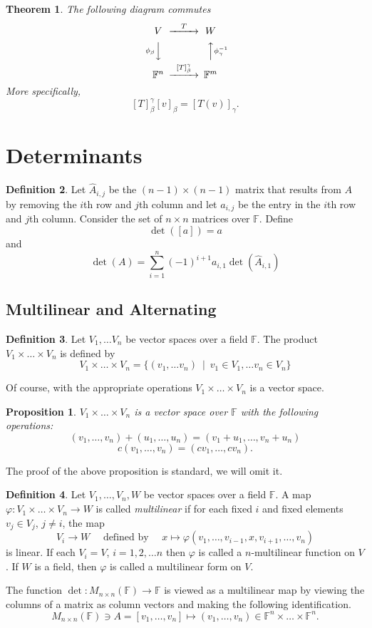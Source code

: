 \documentclass[12pt,letterpaper]{article}
\theoremstyle{plain}
\newtheorem{theorem}{Theorem}[section]
\newtheorem{proposition}{Proposition}[section]
\theoremstyle{definition}
\newtheorem{definition}[theorem]{Definition}
\numberwithin{equation}{section}
\begin{document}
\begin{theorem} The following diagram commutes\\
\[
\begin{CD}
V @>T>> W\\
@V\phi_{\beta}VV @AA\phi_\gamma^{-1} A\\
\mathbb{F}^n @>[T]_{\beta}^\gamma>> \mathbb{F}^m
\end{CD}
\]
More specifically, 
\[[T]_{\beta}^\gamma[v]_{\beta}=[T(v)]_{\gamma}.\]
\end{theorem}
\section{Determinants}
\begin{definition} Let $\hat{A}_{i,j}$ be the $(n-1)\times (n-1)$ matrix that results from $A$ by removing the $i$th row and $j$th column and let $a_{i,j}$ be the entry in the $i$th row and $j$th column.  Consider the set of $n\times n$ matrices over $\mathbb{F}$.  
Define \[\det([a])=a\]
and
\[\det(A)=\sum_{i=1}^n(-1)^{i+1}a_{i,1}\det(\hat{A}_{i,1})\]
\end{definition}
\subsection{Multilinear and Alternating}\label{Multilinear and Alternating}

\begin{definition} Let $V_1, \ldots V_n$ be vector spaces over a field $\mathbb{F}$. The product $V_1\times \ldots \times V_n$ is defined by 
\[V_1\times \ldots \times V_n=\{(v_1,\ldots v_n)\ \mid \ v_1\in V_1, \ldots v_n\in V_n\}\] 
\end{definition}
Of course, with the appropriate operations $V_1\times \ldots \times V_n$ is a vector space. 
\begin{proposition} $V_1\times \ldots \times V_n$ is a vector space over $\mathbb{F}$ with the following operations:
\[(v_1,\ldots, v_n)+(u_1, \ldots, u_n)=(v_1+u_1, \ldots, v_n+u_n)\]
\[c(v_1, \ldots, v_n)=(cv_1, \ldots, cv_n).\]
\end{proposition}
The proof of the above proposition is standard, we will omit it. 
\begin{definition} Let $V_1, \ldots ,V_n, W$ be vector spaces over a field $\mathbb{F}$. 
A map $\varphi:V_1\times\ldots \times V_n\rightarrow W$ is called \emph{multilinear} if for each fixed $i$ and fixed elements $v_j\in V_j$, $j\neq i$, the map
\[V_i\rightarrow W\quad \text{ defined by }\quad x\mapsto \varphi(v_1, \ldots, v_{i-1}, x, v_{i+1}, \ldots ,v_n)\]
is linear. If each $V_i=V$, $i=1,2,\ldots n$ then $\varphi$ is called a $n$-multilinear function on $V$. If $W$ is a field, then $\varphi$ is called a multilinear form on $V$. 

The function $\det:M_{n\times n}(\mathbb{F})\rightarrow \mathbb{F}$ is viewed as a multilinear map by viewing the columns of a matrix as column vectors and making the following identification. 
\[M_{n\times n}(\mathbb{F})\ni A=[v_1,\ldots, v_n]\mapsto (v_1, \ldots, v_n)\in \mathbb{F}^n\times \ldots \times \mathbb{F}^n.\]
\end{definition}
\end{document}

